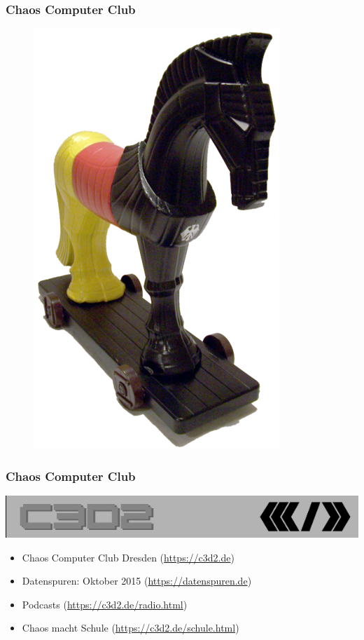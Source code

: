 \documentclass[12pt]{beamer}
\begin{document}
\begin{frame}
  \frametitle{Chaos Computer Club}
  \begin{figure}
    \includegraphics[height=0.7\textheight]{img/trojaner.png}
  \end{figure}
\end{frame}

\begin{frame}
    \frametitle{Chaos Computer Club}
    \begin{center}
	\includegraphics[height=0.1\textheight]{img/c3d2_logo.png}
    \end{center}
    \begin{itemize}
      \item<1-> Chaos Computer Club Dresden (\url{https://c3d2.de})          
      \item<2-> Datenspuren: Oktober 2015 (\url{https://datenspuren.de})
      \item<3-> Podcasts (\url{https://c3d2.de/radio.html})
      \item<4-> Chaos macht Schule (\url{https://c3d2.de/schule.html})
    \end{itemize}
\end{frame}
\end{document}
